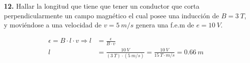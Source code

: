 \documentclass[../main]{subfiles}
\begin{document}
\noindent\textbf{12.} Hallar la longitud que tiene que tener un conductor que corta perpendicularmente un campo magnético el cual posee una inducción de $B=\qty{3}{T}$, y moviéndose a una velocidad de $v=\qty{5}{m/s}$ genera una f.e.m de $e=\qty{10}{V}$.

\begin{align*}
\epsilon = B \cdot l \cdot v \Rightarrow l &= \frac{\epsilon}{B \cdot v} \\
l &= \frac{\qty{10}{V}}{(\qty{3}{T}) \cdot (\qty{5}{m/s})} = \frac{\qty{10}{V}}{\qty{15}{T \cdot m/s}} = \boxed{\qty{0,66}{m}}
\end{align*}
\end{document}
